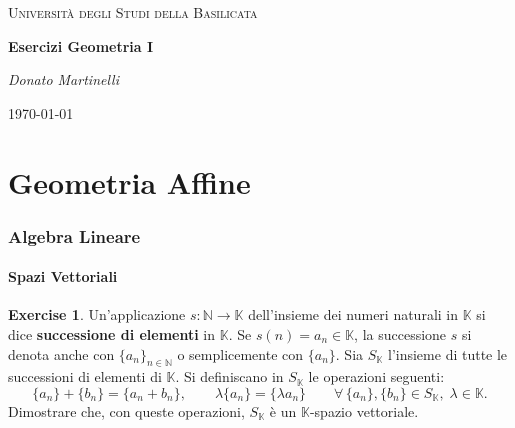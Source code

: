 \documentclass{article}
\theoremstyle{plain}
\theoremstyle{definition}
\newtheorem{xca}[exmp]{Exercise}
\theoremstyle{remark}
\begin{document}
\begin{titlepage}
    \centering
	{\textsc{Università degli Studi della Basilicata} \par}
	\vspace{2cm}
    {\huge\bfseries Esercizi Geometria I\par}
    \vfill
	{\Large\itshape Donato Martinelli\par}
	{\large \today\par}
\end{titlepage}

\tableofcontents

\newpage
\part{Geometria Affine}
\newpage

\newpage
\section{Algebra Lineare}
\vspace{20pt}

\vspace{20pt}
\subsection{Spazi Vettoriali}
\vspace{20pt}


\begin{bxthm}
\begin{xca}\label{uno}
    Un'applicazione $s:\mathbb{N}\to\mathbb{K}$ dell'insieme dei numeri naturali in $\mathbb{K}$ si dice \textbf{successione di elementi} in $\mathbb{K}$. 
    Se $s(n)=a_n\in\mathbb{K}$, la successione $s$ si denota anche con $\{a_n\}_{n\in\mathbb{N}}$ o semplicemente con $\{a_n\}$. 
    Sia $S_\mathbb{K}$ l'insieme di tutte le successioni di elementi di $\mathbb{K}$. 
    Si definiscano in $S_\mathbb{K}$ le operazioni seguenti:
    \[\{a_n\}+\{b_n\}=\{a_n+b_n\},\quad\quad \lambda\{a_n\}=\{\lambda a_n\}\quad\quad\forall\,\{a_n\},\{b_n\}\in S_\mathbb{K},\;\lambda\in\mathbb{K}.\]
    Dimostrare che, con queste operazioni, $S_\mathbb{K}$ è un $\mathbb{K}$-spazio vettoriale.
\end{xca}
\end{bxthm}
\end{document}

